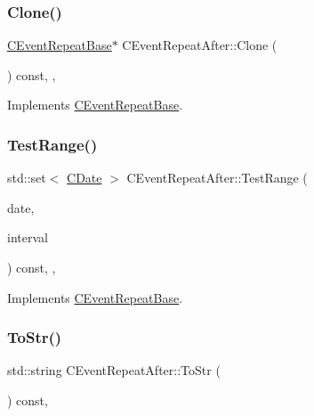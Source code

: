 \subsubsection{\texorpdfstring{Clone()}{Clone()}}
{\footnotesize\ttfamily \mbox{\hyperlink{class_c_event_repeat_base}{C\+Event\+Repeat\+Base}}$\ast$ C\+Event\+Repeat\+After\+::\+Clone (\begin{DoxyParamCaption}{ }\end{DoxyParamCaption}) const\hspace{0.3cm}{\ttfamily [inline]}, {\ttfamily [override]}, {\ttfamily [virtual]}}



Implements \mbox{\hyperlink{class_c_event_repeat_base_a73b079543ea6d97d38933b6a7544e349}{C\+Event\+Repeat\+Base}}.

\mbox{\label{class_c_event_repeat_after_ad4a4b0da551d754d657a10723b39d13c}} 
\subsubsection{\texorpdfstring{Test\+Range()}{TestRange()}}
{\footnotesize\ttfamily std\+::set$<$ \mbox{\hyperlink{class_c_date}{C\+Date}} $>$ C\+Event\+Repeat\+After\+::\+Test\+Range (\begin{DoxyParamCaption}\item[{const \mbox{\hyperlink{class_c_date}{C\+Date}} \&}]{date,  }\item[{const \mbox{\hyperlink{class_c_date_af23472c977b14ed341b48183ec19d874}{C\+Date\+::\+Interval}} \&}]{interval }\end{DoxyParamCaption}) const\hspace{0.3cm}{\ttfamily [override]}, {\ttfamily [protected]}, {\ttfamily [virtual]}}



Implements \mbox{\hyperlink{class_c_event_repeat_base_ad8371820b1c9771c93b452e4c80f4cea}{C\+Event\+Repeat\+Base}}.

\mbox{\label{class_c_event_repeat_after_a367f534544d07fde2ded54374152b9c3}} 
\subsubsection{\texorpdfstring{To\+Str()}{ToStr()}}
{\footnotesize\ttfamily std\+::string C\+Event\+Repeat\+After\+::\+To\+Str (\begin{DoxyParamCaption}{ }\end{DoxyParamCaption}) const\hspace{0.3cm}{\ttfamily [override]}, {\ttfamily [virtual]}}




